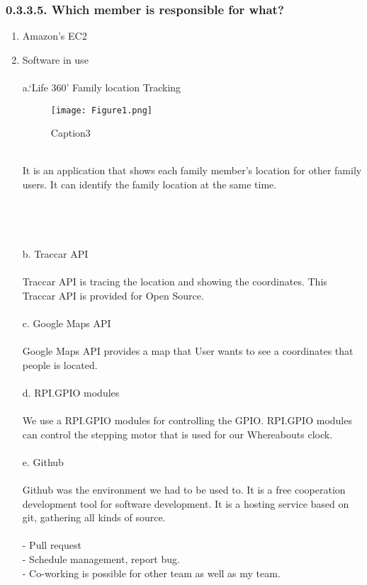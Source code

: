 \documentclass[10pt,a4paper,twocolumn]{report}
\begin{document}
	\subsubsection{0.3.3.5. Which member is responsible for what?}
		\begin{enumerate}
		\item Amazon's EC2 \\
		\item Software in use \\ \\
		a.‘Life 360’ Family location Tracking \\
			\begin{figure}[h]
			\centering
			\texttt{[image: Figure1.png]}
			\caption{Caption3}
			\label{fig3}
			\end{figure} \\
		It is an application that shows each family member’s location for other family users. It can identify the family location at the same time. \\ \\ \\\\\\
		
		 b.	Traccar API \\ \\
		 Traccar API is tracing the location and showing the coordinates. This Traccar API is provided for Open Source.\\ \\
		 
		 c.	Google Maps API \\ \\
		 Google Maps API provides a map that User wants to see a coordinates that people is located. \\ \\
		 
		 d. RPI.GPIO modules \\ \\
		 We use a RPI.GPIO modules for controlling the GPIO. RPI.GPIO modules can control the stepping motor that is used for our Whereabouts clock. \\ \\
		 
		 e.	Github  \\ \\
	  Github was the environment we had to be used to. It is a free cooperation development tool for software development. It is a hosting service based on git, gathering all kinds of source. \\ \\
		 - Pull request \\
		 - Schedule management, report bug. \\
		 - Co-working is possible for other team as well as my team.\\ \\
		

\end{enumerate}
\end{document}
